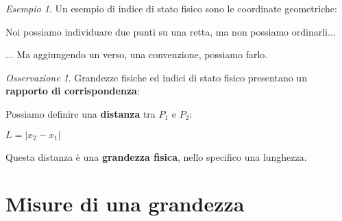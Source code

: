 \documentclass[a4paper, 12pt]{report}
\theoremstyle{definition}
\theoremstyle{remark}
\newtheorem{example}{Esempio}[definition]
\newtheorem{remark}{Osservazione}[definition]
\theoremstyle{plain}
\begin{document}
\begin{example}
    Un esempio di indice di stato fisico sono le coordinate geometriche:
    \begin{center}
    \end{center}
    Noi possiamo individuare due punti su una retta, ma non possiamo ordinarli...
    \begin{center}
    \end{center}
    ... Ma aggiungendo un verso, una convenzione, possiamo farlo.
\end{example}

\begin{remark}
    Grandezze fisiche ed indici di stato fisico presentano un {\bf rapporto di corrispondenza}:
    \begin{center}
    \end{center}
    Possiamo definire una {\bf distanza} tra $P_1$ e $P_2$:
    \begin{center}
        $L = |x_2 - x_1|$\\
    \end{center}
    Questa distanza è una {\bf grandezza fisica}, nello specifico una lunghezza.
\end{remark}

\section{Misure di una grandezza}
\end{document}
